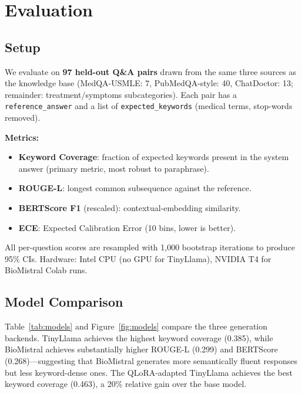 \documentclass[10pt,twocolumn]{article}
\begin{document}
\section{Evaluation}
\label{sec:eval}

\subsection{Setup}
We evaluate on \textbf{97 held-out Q\&A pairs} drawn from the same three
sources as the knowledge base (MedQA-USMLE: 7, PubMedQA-style: 40, ChatDoctor:
13; remainder: treatment/symptoms subcategories).  Each pair has a
\texttt{reference\_answer} and a list of \texttt{expected\_keywords} (medical
terms, stop-words removed).

\noindent
\textbf{Metrics:}
\begin{itemize}[noitemsep]
  \item \textbf{Keyword Coverage}: fraction of expected keywords present in
        the system answer (primary metric, most robust to paraphrase).
  \item \textbf{ROUGE-L}: longest common subsequence against the reference.
  \item \textbf{BERTScore F1} (rescaled): contextual-embedding similarity.
  \item \textbf{ECE}: Expected Calibration Error (10 bins, lower is better).
\end{itemize}

\noindent
All per-question scores are resampled with 1,000 bootstrap iterations to
produce 95\% CIs.  Hardware: Intel CPU (no GPU for TinyLlama), NVIDIA T4 for
BioMistral Colab runs.

\subsection{Model Comparison}

Table~\ref{tab:models} and Figure~\ref{fig:models} compare the three generation
backends.  TinyLlama achieves the highest keyword coverage (0.385), while
BioMistral achieves substantially higher ROUGE-L (0.299) and BERTScore
(0.268)---suggesting that BioMistral generates more semantically fluent responses
but less keyword-dense ones.  The QLoRA-adapted TinyLlama achieves the best
keyword coverage (0.463), a 20\% relative gain over the base model.
\end{document}
